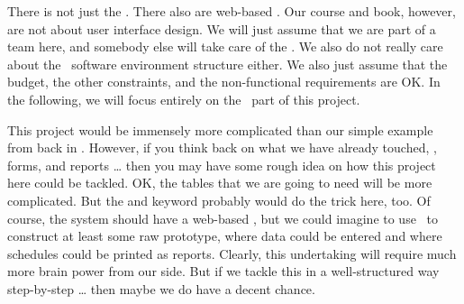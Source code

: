 There is not just the \db.
There also are web-based .
Our course and book, however, are not about user interface design.
We will just assume that we are part of a team here, and somebody else will take care of the .
We also do not really care about the \docker\ software environment structure either.
We also just assume that the budget, the other constraints, and the non-functional requirements are OK.
In the following, we will focus entirely on the \db\ part of this project.

This project would be immensely more complicated than our simple example from back in .
However, if you think back on what we have already touched, \sql, forms, and reports {\dots} then you may have some rough idea on how this project here could be tackled.
OK, the tables that we are going to need will be more complicated.
But the  and  keyword probably would do the trick here, too.
Of course, the system should have a web-based , but we could imagine to use \libreofficeBase\ to construct at least some raw prototype, where data could be entered and where schedules could be printed as reports.
Clearly, this undertaking will require much more brain power from our side.
But if we tackle this in a well-structured way step-by-step {\dots} then maybe we do have a decent chance.%
\endhsection%
%
\endhsection%
\endhsection%
%

